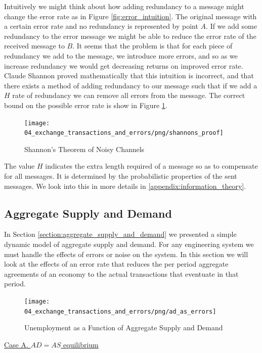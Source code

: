 Intuitively we might think about how adding redundancy to a message might change the error rate as
in Figure \ref{fig:error_intuition}. The original message with a certain error rate and no
redundancy is represented by point $A$. If we add some redundancy to the error message we might be
able to reduce the error rate of the received message to $B$. It seems that the problem is that for
each piece of redundancy we add to the message, we introduce more errors, and so as we increase
redundancy we would get decreasing returns on improved error rate. Claude Shannon proved
mathematically that this intuition is incorrect, and that there exists a method of adding redundancy
to our message such that if we add a $H$ rate of redundancy we can remove all errors from the
message. The correct bound on the possible error rate is show in Figure \ref{fig:shannons_proof}.

\begin{figure}[H]
\centering
\texttt{[image: 04\_exchange\_transactions\_and\_errors/png/shannons\_proof]}
\caption{Shannon's Theorem of Noisy Channels}
\label{fig:shannons_proof}
\end{figure}

The value $H$ indicates the extra length required of a message so as to compensate for all messages.
It is determined by the probabilistic properties of the sent messages. We look into this in more
details in \ref{appendix:information_theory}.

\subsection{Aggregate Supply and Demand}
\label{section:aggregate_supply_and_demand_with_noise}

In Section \ref{section:aggregate_supply_and_demand} we presented a simple dynamic model of aggregate supply and
demand. For any engineering system we must handle the effects of errors or noise on the system. In
this section we will look at the effects of an error rate that reduces the per period aggregate
agreements of an economy to the actual transactions that eventuate in that period.

\begin{figure}[H]
\centering
\texttt{[image: 04\_exchange\_transactions\_and\_errors/png/ad\_as\_errors]}
\caption{Unemployment as a Function of Aggregate Supply and Demand}
\label{fig:ad_as_errors}
\end{figure}

\underline{Case A. $AD=AS$ equilibrium}

